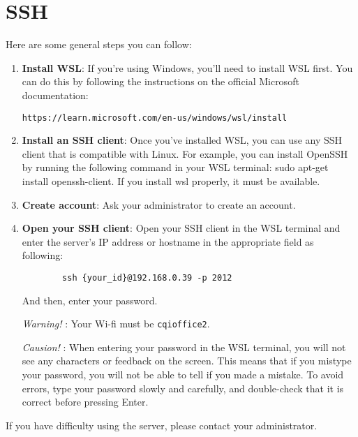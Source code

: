 \documentclass[10pt, a4paper]{article}
\begin{document}
\section*{SSH}
Here are some general steps you can follow:
\begin{enumerate}
    \item \textbf{Install WSL}: If you're using Windows, you'll need to install WSL first. You can do this by following the instructions on the official Microsoft documentation: 
    
    \texttt{https://learn.microsoft.com/en-us/windows/wsl/install}
    \item \textbf{Install an SSH client}:  Once you've installed WSL, you can use any SSH client that is compatible with Linux. For example, you can install OpenSSH by running the following command in your WSL terminal: sudo apt-get install openssh-client. If you install wsl properly, it must be available.
    \item \textbf{Create account}: Ask your administrator to create an account.
    \item \textbf{Open your SSH client}: Open your SSH client in the WSL terminal and enter the server's IP address or hostname in the appropriate field as following:
    \begin{lstlisting}
        ssh {your_id}@192.168.0.39 -p 2012
    \end{lstlisting}
    And then, enter your password.

    \textit{Warning!} : Your Wi-fi must be \texttt{cqioffice2}.

    \textit{Causion!} : When entering your password in the WSL terminal, you will not see any characters or feedback on the screen. This means that if you mistype your password, you will not be able to tell if you made a mistake. To avoid errors, type your password slowly and carefully, and double-check that it is correct before pressing Enter. 
\end{enumerate}
If you have difficulty using the server, please contact your administrator.
\end{document}
